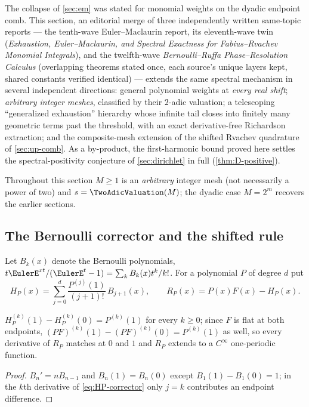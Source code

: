 The collapse of \cref{sec:em} was stated for monomial weights on the
dyadic endpoint comb.  This section, an editorial merge of three
independently written same-topic reports --- the tenth-wave
Euler--Maclaurin report, its eleventh-wave twin (\emph{Exhaustion,
Euler--Maclaurin, and Spectral Exactness for Fabius--Rvachev Monomial
Integrals}), and the twelfth-wave \emph{Bernoulli--Ruffa
Phase--Resolution Calculus} (overlapping theorems stated once, each
source's unique layers kept, shared constants verified identical) ---
extends the same spectral mechanism in several independent
directions: general polynomial weights at \emph{every real
shift}; \emph{arbitrary integer meshes}, classified by their $2$-adic
valuation; a telescoping ``generalized exhaustion'' hierarchy whose
infinite tail closes into finitely many geometric terms past the
threshold, with an exact derivative-free Richardson extraction; and the
composite-mesh extension of the shifted Rvachev quadrature of
\cref{sec:up-comb}.  As a by-product, the first-harmonic bound proved
here settles the spectral-positivity conjecture of
\cref{sec:dirichlet} in full (\cref{thm:D-positive}).

Throughout this section $M\ge1$ is an \emph{arbitrary} integer mesh
(not necessarily a power of two) and $s=\TwoAdicValuation(M)$; the dyadic case
$M=2^{m}$ recovers the earlier sections.

\subsection{The Bernoulli corrector and the shifted rule}

Let $B_k(x)$ denote the Bernoulli polynomials,
$t\EulerE^{xt}/(\EulerE^t-1)=\sum_kB_k(x)t^k/k!$.  For a polynomial $P$ of
degree $d$ put
\begin{equation}
 H_P(x)=\sum_{j=0}^{d}\frac{P^{(j)}(1)}{(j+1)!}\,B_{j+1}(x),
 \qquad
 R_P(x)=P(x)F(x)-H_P(x).
 \label{eq:HP-corrector}
\end{equation}

\begin{lemma}
\label{lem:bern-jump}
$H_P^{(k)}(1)-H_P^{(k)}(0)=P^{(k)}(1)$ for every $k\ge0$; since $F$ is
flat at both endpoints, $(PF)^{(k)}(1)-(PF)^{(k)}(0)=P^{(k)}(1)$ as
well, so every derivative of $R_P$ matches at $0$ and $1$ and $R_P$
extends to a $C^\infty$ one-periodic function.
\end{lemma}

\begin{proof}
$B_n'=nB_{n-1}$ and $B_n(1)=B_n(0)$ except $B_1(1)-B_1(0)=1$; in the
$k$th derivative of \eqref{eq:HP-corrector} only $j=k$ contributes an
endpoint difference.
\end{proof}

